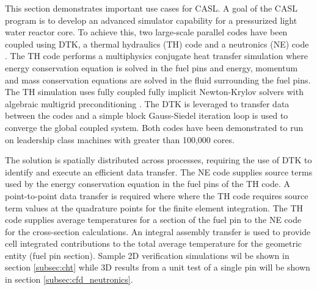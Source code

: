 \documentclass{mc2013}
\begin{document}
\label{sec:examples}

This section demonstrates important use cases for CASL.  A goal of the
CASL program \cite{u.s._department_of_energy_casl_2011} is to develop
an advanced simulator capability for a pressurized light water reactor
core.  To achieve this, two large-scale parallel codes have been
coupled using DTK, a thermal hydraulics (TH) code \cite{drekar_cfd}
and a neutronics (NE) code \cite{denovo_2010}.  The TH code performs a
multiphysics conjugate heat transfer simulation where energy
conservation equation is solved in the fuel pins and energy, momentum
and mass conservation equations are solved in the fluid surrounding
the fuel pins.  The TH simulation uses fully coupled fully implicit
Newton-Krylov solvers with algebraic multigrid preconditioning
\cite{shadid_2006}.  The DTK is leveraged to transfer data between the
codes and a simple block Gauss-Siedel iteration loop is used to
converge the global coupled system.  Both codes have been demonstrated
to run on leadership class machines with greater than 100,000 cores.

The solution is spatially distributed across processes, requiring the
use of DTK to identify and execute an efficient data transfer.  The NE
code supplies source terms used by the energy conservation equation in
the fuel pins of the TH code.  A point-to-point data transfer is
required where where the TH code requires source term values at the
quadrature points for the finite element integration.  The TH code
supplies average temperatures for a section of the fuel pin to the NE
code for the cross-section calculations.  An integral assembly
transfer is used to provide cell integrated contributions to the total
average temperature for the geometric entity (fuel pin section).
Sample 2D verification simulations wil be shown in section
\ref{subsec:cht} while 3D results from a unit test of a single pin
will be shown in section \ref{subsec:cfd_neutronics}.

\label{subsec:cht}
\end{document}
